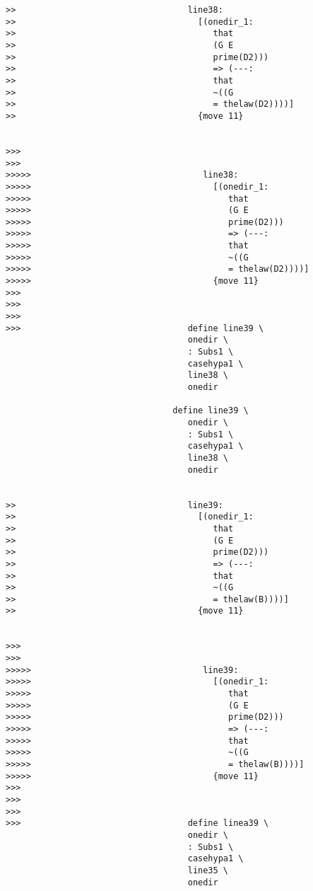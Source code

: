 \documentclass[12pt]{article}
\begin{document}
\begin{verbatim}
>>                                  line38:
>>                                    [(onedir_1:
>>                                       that
>>                                       (G E
>>                                       prime(D2)))
>>                                       => (---:
>>                                       that
>>                                       ~((G
>>                                       = thelaw(D2))))]
>>                                    {move 11}


>>>
>>>
>>>>>                                  line38:
>>>>>                                    [(onedir_1:
>>>>>                                       that
>>>>>                                       (G E
>>>>>                                       prime(D2)))
>>>>>                                       => (---:
>>>>>                                       that
>>>>>                                       ~((G
>>>>>                                       = thelaw(D2))))]
>>>>>                                    {move 11}
>>>
>>>
>>>
>>>                                 define line39 \
                                    onedir \
                                    : Subs1 \
                                    casehypa1 \
                                    line38 \
                                    onedir

                                 define line39 \
                                    onedir \
                                    : Subs1 \
                                    casehypa1 \
                                    line38 \
                                    onedir


>>                                  line39:
>>                                    [(onedir_1:
>>                                       that
>>                                       (G E
>>                                       prime(D2)))
>>                                       => (---:
>>                                       that
>>                                       ~((G
>>                                       = thelaw(B))))]
>>                                    {move 11}


>>>
>>>
>>>>>                                  line39:
>>>>>                                    [(onedir_1:
>>>>>                                       that
>>>>>                                       (G E
>>>>>                                       prime(D2)))
>>>>>                                       => (---:
>>>>>                                       that
>>>>>                                       ~((G
>>>>>                                       = thelaw(B))))]
>>>>>                                    {move 11}
>>>
>>>
>>>
>>>                                 define linea39 \
                                    onedir \
                                    : Subs1 \
                                    casehypa1 \
                                    line35 \
                                    onedir


\end{verbatim}
\end{document}

